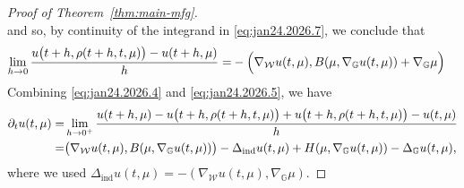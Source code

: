 \documentclass[10pt]{article}
\numberwithin{equation}{section}
\newcommand{\cW}{ \mathcal{W}}
\def\G{\mathbb{G}}
\begin{document}
\begin{proof}[Proof of Theorem~\ref{thm:main-mfg}]
\[\]
and so, by continuity of the integrand in \eqref{eq:jan24.2026.7}, we conclude that 
%
\begin{align} 
 \lim_{h \to 0}  {u\big(t+h, \rho(t+h, t, \mu)\big)-u(t+h,\mu)\over h}
=&- \Big( \nabla_\cW u(t, \mu), B(\mu ,\nabla_{\G}u(t, \mu))+\nabla_{\G}\mu\Big)\label{eq:jan24.2026.5}
\end{align}
Combining \eqref{eq:jan24.2026.4} and \eqref{eq:jan24.2026.5}, we have 
\begin{align*} 
\partial_t u(t, \mu)=&\lim_{h \to 0^+} {u(t+h,\mu)-u\big(t+h, \rho(t+h, t, \mu)\big) +u\big(t+h, \rho(t+h, t, \mu)\big)-u(t,\mu)\over h}\\
=& \big( \nabla_\cW u(t, \mu), B(\mu ,\nabla_{\G}u(t, \mu))\big)-\Delta_\text{ind}u(t,\mu)+ H(\mu,\nabla_{\G}u(t, \mu))-\Delta_{\G}u(t, \mu),
\end{align*}
where we used $\Delta_\text{ind}u(t,\mu)=-(\nabla_\cW u(t,\mu), \nabla_\G\mu)$.


\end{proof}
\end{document}
